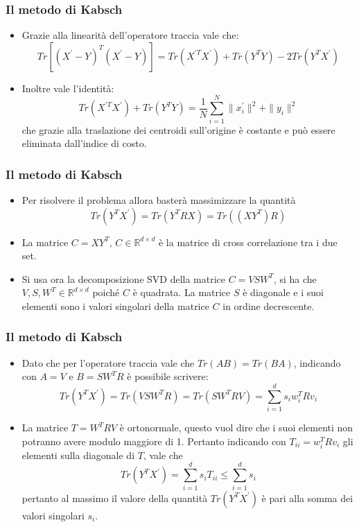 \documentclass{beamer}
\begin{document}
\begin{frame}
\frametitle{Il metodo di Kabsch}
\begin{itemize}
	\item Grazie alla linearità dell'operatore traccia vale che:
	\begin{equation}
	Tr[(X^{'} - Y)^{T}(X^{'} - Y)] = Tr(X^{'T}X^{'}) + Tr(Y^{T}Y) - 2Tr(Y^{T}X^{'})
	\end{equation}
	\item Inoltre vale l'identità:
	\begin{equation}
	\label{rot:eq:mod}
	Tr(X^{'T}X^{'}) + Tr(Y^{T}Y) = \frac{1}{N}\sum_{i = 1}^{N} \| x_i^{'} \| ^ 2 + \| y_i \| ^ 2
	\end{equation}
	che grazie alla traslazione dei centroidi sull'origine è costante e può essere eliminata dall'indice di costo.
\end{itemize}
\end{frame}

\begin{frame}
\frametitle{Il metodo di Kabsch}
\begin{itemize}
	\item Per risolvere il problema allora basterà massimizzare la quantità
	\begin{equation}
		Tr(Y^{T}X^{'}) = Tr(Y^{T}RX) = Tr((XY^{T})R)
	\end{equation}
	\item La matrice $ C = XY^{T}, \, C \in \mathbb{R}^{d \times d}$ è la matrice di cross correlazione tra i due set.
	\item Si usa ora la decomposizione SVD della matrice $C = VSW^T$, si ha che $V, S, W^T \in \mathbb{R}^{d \times d}$ poiché $C$ è quadrata. La matrice $S$ è diagonale e i suoi elementi sono i valori singolari della matrice $C$ in ordine decrescente.
\end{itemize}
\end{frame}

\begin{frame}
\frametitle{Il metodo di Kabsch}
\begin{itemize}
	\item Dato che per l'operatore traccia vale che $Tr(AB) = Tr(BA)$, indicando con $A = V$ e $B = SW^TR$ è possibile scrivere:
	\begin{equation}
	Tr(Y^{T}X^{'}) = Tr(VSW^TR) = Tr(SW^TRV) = \sum_{i = 1}^{d} s_iw_i^TRv_i
	\end{equation}
	\item La matrice $T = W^TRV$ è ortonormale, questo vuol dire che i suoi elementi non potranno avere modulo maggiore di 1. Pertanto indicando con $T_{ii} = w_i^TRv_i$ gli elementi sulla diagonale di $T$, vale che
	\begin{equation}
	Tr(Y^{T}X^{'}) = \sum_{i = 1}^{d} s_iT_{ii} \leq \sum_{i = 1}^{d} s_i
	\end{equation}
	pertanto al massimo il valore della quantità $Tr(Y^{T}X^{'})$ è pari alla somma dei valori singolari $s_i$.
\end{itemize}
\end{frame}
\end{document}
